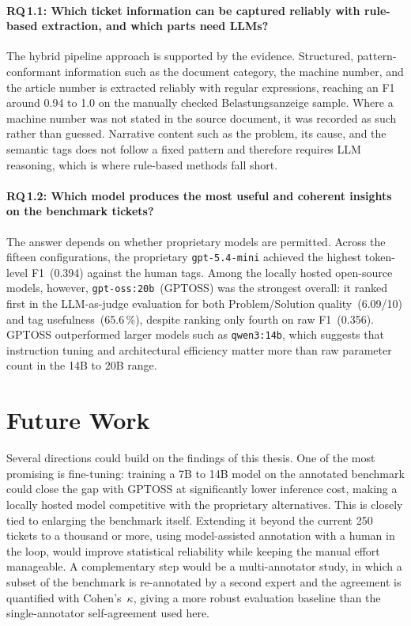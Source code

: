 \paragraph{RQ\,1.1: Which ticket information can be captured reliably with
rule-based extraction, and which parts need LLMs?}
The hybrid pipeline approach is supported by the evidence.  Structured,
pattern-conformant information such as the document category, the machine number,
and the article number is extracted reliably with regular expressions, reaching
an F1 around 0.94 to 1.0 on the manually checked Belastungsanzeige sample.  Where
a machine number was not stated in the source document, it was recorded as such
rather than guessed.  Narrative content such as the problem, its cause, and the
semantic tags does not follow a fixed pattern and therefore requires LLM
reasoning, which is where rule-based methods fall short.

\paragraph{RQ\,1.2: Which model produces the most useful and coherent insights
on the benchmark tickets?}
The answer depends on whether proprietary models are permitted.  Across the
fifteen configurations, the proprietary \texttt{gpt-5.4-mini} achieved the
highest token-level F1~(0.394) against the human tags.  Among the locally
hosted open-source models, however, \texttt{gpt-oss:20b}~(GPTOSS) was the
strongest overall: it ranked first in the LLM-as-judge evaluation for both
Problem/Solution quality~(6.09/10) and tag usefulness~(65.6\,\%), despite
ranking only fourth on raw F1~(0.356).  GPTOSS outperformed larger models such
as \texttt{qwen3:14b}, which suggests that instruction tuning and architectural
efficiency matter more than raw parameter count in the 14B to 20B range.

\section{Future Work}
\label{sec:future-work}
%
Several directions could build on the findings of this thesis.  One of the most
promising is fine-tuning: training a 7B to 14B model on the annotated benchmark
could close the gap with GPTOSS at significantly lower inference cost, making a
locally hosted model competitive with the proprietary alternatives.  This is
closely tied to enlarging the benchmark itself.  Extending it beyond the current
250 tickets to a thousand or more, using model-assisted annotation with a human
in the loop, would improve statistical reliability while keeping the manual
effort manageable.  A complementary step would be a multi-annotator study, in
which a subset of the benchmark is re-annotated by a second expert and the
agreement is quantified with Cohen's~$\kappa$, giving a more robust evaluation
baseline than the single-annotator self-agreement used here.

